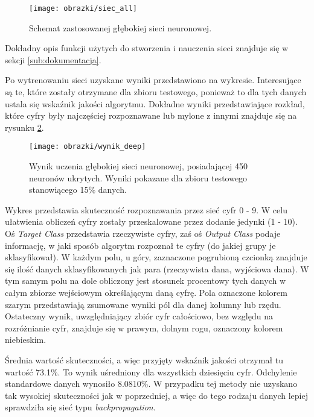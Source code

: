 \begin{center}
\begin{figure}[H]
	\centering
	\texttt{[image: obrazki/siec\_all]}
	\caption{\label{fig:subcaption_example}Schemat zastosowanej głębokiej sieci neuronowej.}{\label{fig:siec_n}}
\end{figure}
\end{center}

\noindent Dokładny opis funkcji użytych do stworzenia i nauczenia sieci znajduje się w sekcji \ref{sub:dokumentacja}. 


\noindent Po wytrenowaniu sieci uzyskane wyniki przedstawiono na wykresie. Interesujące są te, które zostały otrzymane dla zbioru testowego, ponieważ to dla tych danych ustala się wskaźnik jakości algorytmu. Dokładne wyniki przedstawiające rozkład, które cyfry były najczęściej rozpoznawane lub mylone z innymi znajduje się na rysunku \ref{fig:wynik2}.

\begin{center}
\begin{figure}[H]
	\centering
	\texttt{[image: obrazki/wynik\_deep]}
	\caption{\label{fig:subcaption_example}Wynik uczenia głębokiej sieci neuronowej, posiadającej 450 neuronów ukrytych. Wyniki pokazane dla zbioru testowego stanowiącego 15\% danych.}{\label{fig:wynik2}}
\end{figure}
\end{center}


\noindent Wykres przedstawia skuteczność rozpoznawania przez sieć cyfr 0 - 9. W celu ułatwienia obliczeń cyfry zostały przeskalowane przez dodanie jedynki (1 - 10). Oś \textit{Target Class} przedstawia rzeczywiste cyfry, zaś oś \textit{Output Class} podaje informację, w jaki sposób algorytm rozpoznał te cyfry (do jakiej grupy je sklasyfikował). W każdym polu, u góry, zaznaczone pogrubioną czcionką znajduje się ilość danych sklasyfikowanych jak para (rzeczywista dana, wyjściowa dana). W tym samym polu na dole obliczony jest stosunek procentowy tych danych w całym zbiorze wejściowym określającym daną cyfrę. Pola oznaczone kolorem szarym przedstawiają zsumowane wyniki pól dla danej kolumny lub rzędu. Ostateczny wynik, uwzględniający zbiór cyfr całościowo, bez względu na rozróżnianie cyfr, znajduje się w prawym, dolnym rogu, oznaczony kolorem niebieskim.


\noindent Średnia wartość skuteczności, a więc przyjęty wskaźnik jakości otrzymał tu wartość 73.1\%. To wynik uśredniony dla wszystkich dziesięciu cyfr. Odchylenie standardowe danych wynosiło 8.0810\%. W przypadku tej metody nie uzyskano tak wysokiej skuteczności jak w poprzedniej, a więc do tego rodzaju danych lepiej sprawdziła się sieć typu \textit{backpropagation}. 


